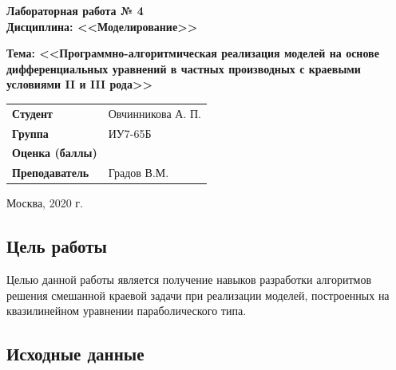 \documentclass[a4paper,14pt]{article}
\begin{document}
\begin{titlepage}
    \vspace{3cm}

    \begin{center}
		\textbf{Лабораторная работа № 4} \\
		\textbf{Дисциплина: <<Моделирование>>}
        \vspace{0.5cm}
	\end{center}

	\begin{center}
		\textbf{Тема: <<Программно-алгоритмическая реализация моделей на основе дифференциальных уравнений в частных производных  с краевыми условиями II и  III рода>>}
        \vspace{0.5cm}
    \end{center}

    \vspace{2cm}

	\begin{flushleft}
        \begin{tabular}{ll}
            \textbf{Студент} & Овчинникова А. П. \\
            \textbf{Группа} & ИУ7-65Б \\
            \textbf{Оценка (баллы)} & \\
            \textbf{Преподаватель} & Градов В.М.   \\
        \end{tabular}
    \end{flushleft}

    \vspace{2cm}

   \begin{center}
        Москва, 2020 г.
    \end{center}

\end{titlepage}

\setcounter{page}{2}

\subsection*{Цель работы}

Целью данной работы является получение навыков 
разработки  алгоритмов решения смешанной краевой
 задачи при реализации моделей, построенных на 
 квазилинейном уравнении параболического типа. 

\subsection*{Исходные данные}
\end{document}
